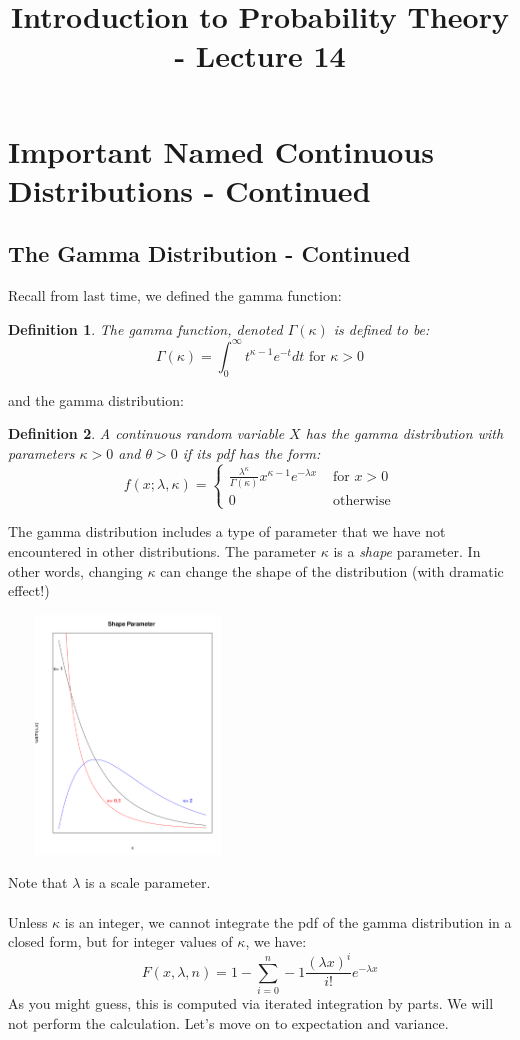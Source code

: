 \documentclass[12pt]{article} %
\date{}
\title{Introduction to Probability Theory - Lecture 14}
\newtheorem{defn}{Definition}
\begin{document}
\maketitle

\section{Important Named Continuous Distributions - Continued}
\subsection{The Gamma Distribution - Continued}
Recall from last time, we defined the gamma function: 
\begin{defn}
The gamma function, denoted $\Gamma(\kappa)$ is defined to be:
$$\Gamma(\kappa) = \int_0^{\infty} t^{\kappa -1} e^{-t} dt \textrm{ for } \kappa >0$$
\end{defn}
and the gamma distribution:
\begin{defn}
A continuous random variable $X$ has the gamma distribution with parameters $\kappa>0$ and $\theta>0$ if its pdf has the form:
$$f(x;\lambda,\kappa) = \left\{\begin{matrix}
\frac{\lambda^\kappa}{\Gamma(\kappa)}x^{\kappa-1} e^{-\lambda x} & \textrm{ for } x>0\\0&\textrm{ otherwise}\end{matrix}\right.$$
\end{defn}
The gamma distribution includes a type of parameter that we have not encountered in other distributions. The parameter $\kappa$ is a \emph{shape} parameter. In other words, changing $\kappa$ can change the shape of the distribution (with dramatic effect!)

\includegraphics[height=2.5in,width=2.5in]{shape.pdf}

Note that $\lambda$ is a scale parameter.\\\\
Unless $\kappa$ is an integer, we cannot integrate the pdf of the gamma distribution in a closed form, but for integer values of $\kappa$, we have:
$$F(x,\lambda,n) = 1-\sum_{i=0}^n-1 \frac{\left(\lambda x\right)^i}{i!} e^{-\lambda x}$$
As you might guess, this is computed via iterated integration by parts. We will not perform the calculation. Let's move on to expectation and variance.
\end{document}
